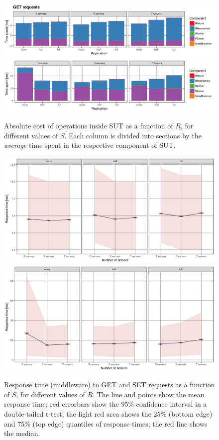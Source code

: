 \documentclass[11pt]{article}
\begin{document}
\begin{figure}[h]
\centering
\includegraphics[width=\textwidth]{../results/replication/graphs/time_breakdown_vs_replication_get_abs.pdf}
\includegraphics[width=\textwidth]{../results/replication/graphs/time_breakdown_vs_replication_set_abs.pdf}
\caption{Absolute cost of operations inside SUT as a function of $R$, for different values of $S$. Each column is divided into sections by the \emph{average} time spent in the respective component of SUT.}
\label{fig:exp2:res:breakdown}
\end{figure}

\begin{figure}[h]
\centering
\includegraphics[width=\textwidth]{../results/replication/graphs/response_time_vs_servers_get.pdf}
\includegraphics[width=\textwidth]{../results/replication/graphs/response_time_vs_servers_set.pdf}
\caption{Response time (middleware) to GET and SET requests as a function of $S$, for different values of $R$. The line and points show the mean response time; red errorbars show the 95\% confidence interval in a double-tailed t-test; the light red area shows the 25\% (bottom edge) and 75\% (top edge) quantiles of response times; the red line shows the median.}
\label{fig:exp2:res:servers}
\end{figure}
\end{document}

